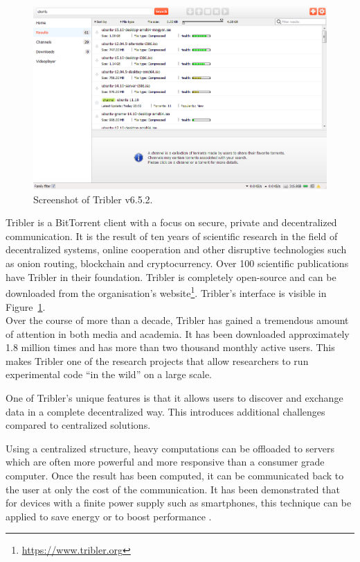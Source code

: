 \begin{figure}[!h]
	\centering
	\includegraphics[width=\linewidth]{introduction/images/tribler_screenshot.png}
	\caption{Screenshot of Tribler v6.5.2.}
	\label{fig:tribler_screenshot}
\end{figure}

Tribler is a BitTorrent client with a focus on secure, private and decentralized communication.
It is the result of ten years of scientific research in the field of decentralized systems, online cooperation and other disruptive technologies such as onion routing, blockchain and cryptocurrency.
Over 100 scientific publications have Tribler in their foundation.
Tribler is completely open-source and can be downloaded from the organisation's website\footnote{\url{https://www.tribler.org}}.
Tribler's interface is visible in Figure~\ref{fig:tribler_screenshot}.\\
Over the course of more than a decade, Tribler has gained a tremendous amount of attention in both media and academia.
It has been downloaded approximately 1.8 million times \cite{github2016releases} and has more than two thousand monthly active users.
This makes Tribler one of the research projects that allow researchers to run experimental code \enquote{in the wild} on a large scale.

One of Tribler's unique features is that it allows users to discover and exchange data in a complete decentralized way.
This introduces additional challenges compared to centralized solutions.

Using a centralized structure, heavy computations can be offloaded to servers which are often more powerful and more responsive than a consumer grade computer.
Once the result has been computed, it can be communicated back to the user at only the cost of the communication. 
It has been demonstrated that for devices with a finite power supply such as smartphones, this technique can be applied to save energy or to boost performance \cite{kumar2010cloud, kemp2010cuckoo}.

